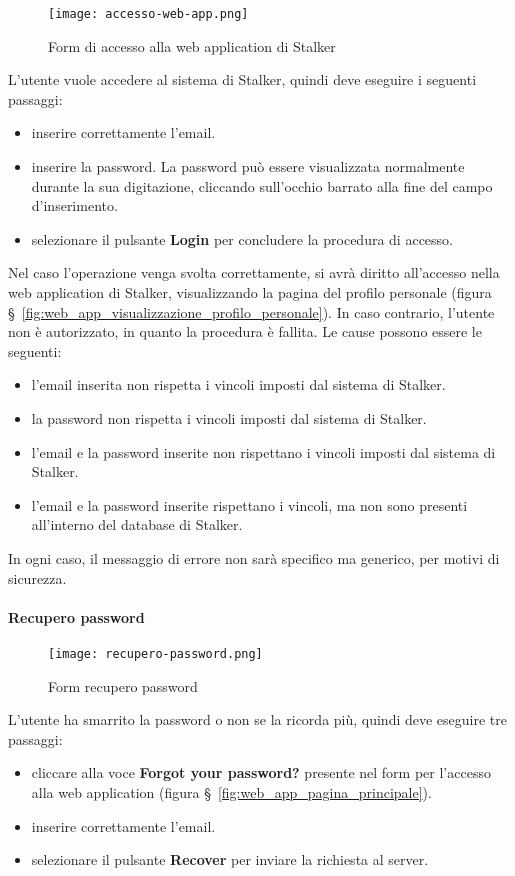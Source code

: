 \documentclass[../manuale-utente.tex]{subfiles}
\begin{document}
\begin{figure}[H]
    \centering
    \texttt{[image: accesso-web-app.png]}
    \caption{Form di accesso alla web application di Stalker}%
    \label{fig:web_app_form_accesso}
\end{figure}
L'utente vuole accedere al sistema di Stalker, quindi deve eseguire i seguenti passaggi:
\begin{itemize}
    \item inserire correttamente l'email.
    \item inserire la password. La password può essere visualizzata normalmente durante la sua digitazione, cliccando sull'occhio barrato alla fine del campo d'inserimento.
    \item selezionare il pulsante \textbf{Login} per concludere la procedura di accesso.
\end{itemize}
Nel caso l'operazione venga svolta correttamente, si avrà diritto all'accesso nella web application di Stalker, visualizzando la pagina del profilo personale (figura §~\ref{fig:web_app_visualizzazione_profilo_personale}).
In caso contrario, l'utente non è autorizzato, in quanto la procedura è fallita.
Le cause possono essere le seguenti:
\begin{itemize}
    \item l'email inserita non rispetta i vincoli imposti dal sistema di Stalker.
    \item la password non rispetta i vincoli imposti dal sistema di Stalker.
    \item l'email e la password inserite non rispettano i vincoli imposti dal sistema di Stalker.
    \item l'email e la password inserite rispettano i vincoli, ma non sono presenti all'interno del database di Stalker.
\end{itemize}
In ogni caso, il messaggio di errore non sarà specifico ma generico, per motivi di sicurezza.

\paragraph{Recupero password}%
\label{par:recupero_password}

\begin{figure}[H]
    \centering
    \texttt{[image: recupero-password.png]}
    \caption{Form recupero password}%
    \label{fig:web_app_form_recupero_password}
\end{figure}
L'utente ha smarrito la password o non se la ricorda più, quindi deve eseguire tre passaggi:
\begin{itemize}
    \item cliccare alla voce \textbf{Forgot your password?} presente nel form per l'accesso alla web application (figura §~\ref{fig:web_app_pagina_principale}).
    \item inserire correttamente l'email.
    \item selezionare il pulsante \textbf{Recover} per inviare la richiesta al server.
\end{itemize}
\end{document}
